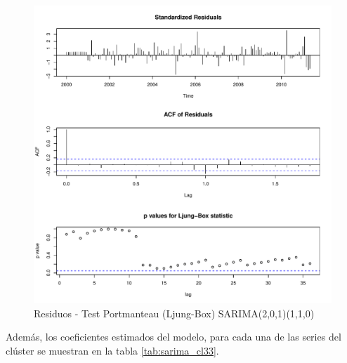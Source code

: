 \documentclass[12pt,oneside]{book}\usepackage[]{graphicx}\usepackage[]{color}
\makeatletter
\def\maxwidth{ %
  \ifdim\Gin@nat@width>\linewidth
    \linewidth
  \else
    \Gin@nat@width
  \fi
}
\newenvironment{knitrout}{}{} %
\theoremstyle{definition} %
\makeatother
\begin{document}
\begin{knitrout}
\color{fgcolor}\begin{figure}[h]

{\centering \includegraphics[width=\maxwidth]{figure/unnamed-chunk-85-1} 

}

\caption[Residuos - Test Portmanteau (Ljung-Box) SARIMA(2,0,1)(1,1,0)]{Residuos - Test Portmanteau (Ljung-Box) SARIMA(2,0,1)(1,1,0)}\label{fig:unnamed-chunk-85}
\end{figure}


\end{knitrout}


Además, los coeficientes estimados del modelo, para cada una de las series del clúster se muestran en la tabla \ref{tab:sarima_cl33}.
\end{document}

